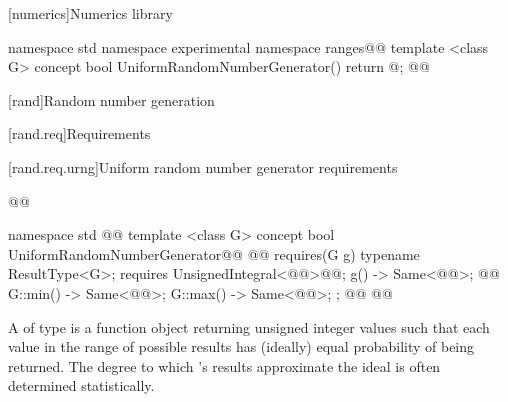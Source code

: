 [numerics]{Numerics library}

{\color{newclr}

\begin{codeblock}
namespace std { namespace experimental { namespace ranges@@ {
  template <class G>
  concept bool UniformRandomNumberGenerator() { return @\seebelow@; }
}}}@\newtxt{\}}@
\end{codeblock}
}

\setcounter{section}{4}
[rand]{Random number generation}

[rand.req]{Requirements}


\setcounter{subsubsection}{2}
[rand.req.urng]{Uniform random number generator requirements}%
%

\begin{addedblock}
\begin{codeblock}
@@

namespace std { @@
  template <class G>
  concept bool UniformRandomNumberGenerator@\newtxt{() \{}\oldtxt{ =}@
    @@ requires(G g) {
      typename ResultType<G>;
      requires UnsignedIntegral<@@>@\newtxt{()}@;
      { g() } -> Same<@@>; @@
      { G::min() } -> Same<@@>;
      { G::max() } -> Same<@@>;
    };
  @\newtxt{\}}@
}@\newtxt{\}\}\}}@
\end{codeblock}
\end{addedblock}

\pnum
A 
 of type 
is a function object
returning unsigned integer values
such that each value
in the range of possible results
has (ideally) equal probability
of being returned.
\enternote
 The degree to which 's results
 approximate the ideal
 is often determined statistically.
\exitnote

